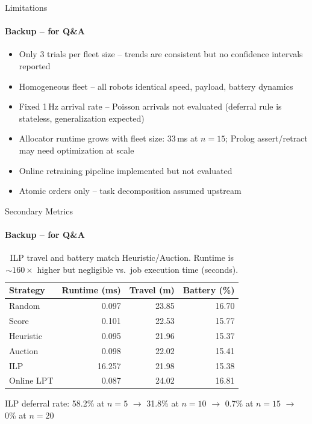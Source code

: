 \documentclass[aspectratio=169]{beamer}
\begin{document}
\begin{frame}[shrink=10]{Limitations}
  \framesubtitle{Backup -- for Q\&A}
  \begin{itemize}
    \item Only 3 trials per fleet size -- trends are consistent but no confidence intervals reported
    \item Homogeneous fleet -- all robots identical speed, payload, battery dynamics
    \item Fixed 1\,Hz arrival rate -- Poisson arrivals not evaluated (deferral rule is stateless, generalization expected)
    \item Allocator runtime grows with fleet size: 33\,ms at $n=15$; Prolog assert/retract may need optimization at scale
    \item Online retraining pipeline implemented but not evaluated
    \item Atomic orders only -- task decomposition assumed upstream
  \end{itemize}
\end{frame}

\begin{frame}{Secondary Metrics}
  \framesubtitle{Backup -- for Q\&A}
  \small
  \begin{table}
    \begin{tabularx}{\textwidth}{Xrrr}
      \textbf{Strategy} & \textbf{Runtime (ms)} & \textbf{Travel (m)} & \textbf{Battery (\%)} \\
      \toprule
      Random      &  0.097 & 23.85 & 16.70 \\
      Score       &  0.101 & 22.53 & 15.77 \\
      Heuristic   &  0.095 & 21.96 & 15.37 \\
      Auction     &  0.098 & 22.02 & 15.41 \\
      \alert{ILP} & \alert{16.257} & \alert{21.98} & \alert{15.38} \\
      Online LPT  &  0.087 & 24.02 & 16.81 \\
      \bottomrule
    \end{tabularx}
    \caption{ILP travel and battery match Heuristic/Auction. Runtime is ${\sim}160\times$ higher but negligible vs.\ job execution time (seconds).}
  \end{table}
  \vspace{0.2em}
  \small ILP deferral rate: 58.2\% at $n=5$ $\to$ 31.8\% at $n=10$ $\to$ 0.7\% at $n=15$ $\to$ 0\% at $n=20$
\end{frame}
\end{document}
